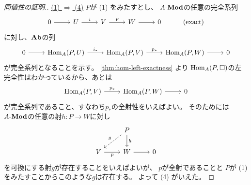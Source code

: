 \documentclass[report]{jlreq}
\begin{document}
\begin{proof}[同値性の証明.]
    \uline{(1) $\Rightarrow$ (4)} \quad
    $P$が (1) をみたすとし、
    $A\text{-}\mathbf{Mod}$の任意の完全系列
    \begin{equation}
        \begin{tikzcd}
            0 \ar{r}
                & U \ar{r}{i}
                & V \ar{r}{p}
                & W \ar{r}
                & 0
                & (\text{exact})
        \end{tikzcd}
    \end{equation}
    に対し、$\mathbf{Ab}$の列
    \begin{equation}
        \begin{tikzcd}
            0 \ar{r}
                & \Hom_A(P, U) \ar{r}{i_*}
                & \Hom_A(P, V) \ar{r}{p_*}
                & \Hom_A(P, W) \ar{r}
                & 0
        \end{tikzcd}
    \end{equation}
    が完全系列となることを示す。
    \cref{thm:hom-left-exactness} より
    $\operatorname{Hom}_A(P, \Box)$の左完全性はわかっているから、あとは
    \begin{equation}
        \begin{tikzcd}
            \Hom_A(P, V) \ar{r}{p_*}
                & \Hom_A(P, W) \ar{r}
                & 0
        \end{tikzcd}
    \end{equation}
    が完全系列であること、すなわち$p_*$の全射性をいえばよい。
    そのためには$A\text{-}\mathbf{Mod}$の任意の射$h \colon P \to W$に対し
    \begin{equation}
        \begin{tikzcd}
            & P \ar[dashed]{ld}[swap]{g} \ar{d}{h} \\
            V \ar{r}[swap]{p}
                & W \ar{r}
                & 0
        \end{tikzcd}
    \end{equation}
    を可換にする射$g$が存在することをいえばよいが、
    $p$が全射であることと
    $P$が (1) をみたすことからこのような$g$は存在する。
    よって (4) がいえた。


\end{proof}
\end{document}
